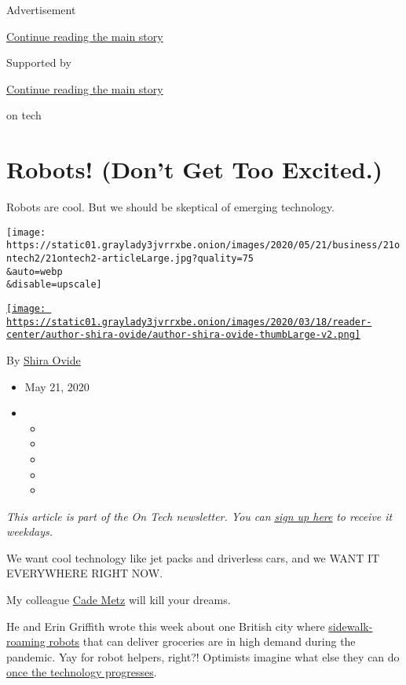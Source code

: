 Advertisement

\protect\hyperlink{after-top}{Continue reading the main story}

Supported by

\protect\hyperlink{after-sponsor}{Continue reading the main story}

on tech

\hypertarget{robots-dont-get-too-excited}{%
\section{Robots! (Don't Get Too
Excited.)}\label{robots-dont-get-too-excited}}

Robots are cool. But we should be skeptical of emerging technology.

\texttt{[image: https://static01.graylady3jvrrxbe.onion/images/2020/05/21/business/21ontech2/21ontech2-articleLarge.jpg?quality=75\\\&auto=webp\\\&disable=upscale]}

\href{https://www.nytimes3xbfgragh.onion/by/shira-ovide}{\texttt{[image: https://static01.graylady3jvrrxbe.onion/images/2020/03/18/reader-center/author-shira-ovide/author-shira-ovide-thumbLarge-v2.png]}}

By \href{https://www.nytimes3xbfgragh.onion/by/shira-ovide}{Shira Ovide}

\begin{itemize}
\item
  May 21, 2020
\item
  \begin{itemize}
  \item
  \item
  \item
  \item
  \item
  \end{itemize}
\end{itemize}

\emph{This article is part of the On Tech newsletter. You can}
\href{https://www.nytimes3xbfgragh.onion/newsletters/signup/OT}{\emph{sign
up here}} \emph{to receive it weekdays.}

We want cool technology like jet packs and driverless cars, and we WANT
IT EVERYWHERE RIGHT NOW.

My colleague \href{https://www.nytimes3xbfgragh.onion/by/cade-metz}{Cade
Metz} will kill your dreams.

He and Erin Griffith wrote this week about one British city where
\href{https://www.nytimes3xbfgragh.onion/2020/05/20/technology/delivery-robots-coronavirus-milton-keynes.html}{sidewalk-roaming
robots} that can deliver groceries are in high demand during the
pandemic. Yay for robot helpers, right?! Optimists imagine what else
they can do
\href{https://arstechnica.com/tech-policy/2020/04/the-pandemic-is-bringing-us-closer-to-our-robot-takeout-future/}{once
the technology progresses}.

